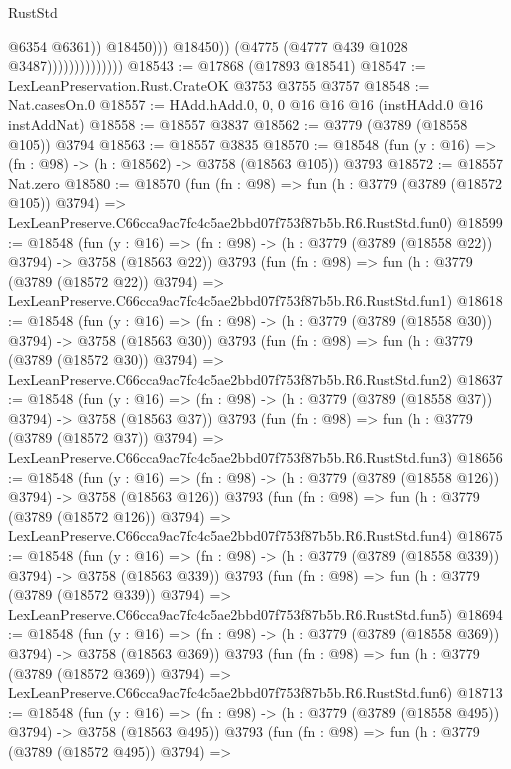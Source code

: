 \begin{lexlean}{RustStd}
\begin{coremodule}
                                          @6354
                                          @6361))
                                      @18450)))
                                @18450))
                            (@4775 (@4777 @439 @1028 @3487))))))))))))))
@18543 := @17868 (@17893 @18541)
@18547 := LexLeanPreservation.Rust.CrateOK @3753 @3755 @3757
@18548 := Nat.casesOn.{0}
@18557 := HAdd.hAdd.{0, 0, 0} @16 @16 @16 (instHAdd.{0} @16 instAddNat)
@18558 := @18557 @3837
@18562 := @3779 (@3789 (@18558 @105)) @3794
@18563 := @18557 @3835
@18570 := @18548 (fun (y : @16) => (fn : @98) -> (h : @18562) -> @3758 (@18563 @105)) @3793
@18572 := @18557 Nat.zero
@18580 := @18570
    (fun (fn : @98) =>
    fun (h : @3779 (@3789 (@18572 @105)) @3794) =>
    LexLeanPreserve.C66cca9ac7fc4c5ae2bbd07f753f87b5b.R6.RustStd.fun0)
@18599 := @18548
    (fun (y : @16) => (fn : @98) -> (h : @3779 (@3789 (@18558 @22)) @3794) -> @3758 (@18563 @22))
    @3793
    (fun (fn : @98) =>
    fun (h : @3779 (@3789 (@18572 @22)) @3794) =>
    LexLeanPreserve.C66cca9ac7fc4c5ae2bbd07f753f87b5b.R6.RustStd.fun1)
@18618 := @18548
    (fun (y : @16) => (fn : @98) -> (h : @3779 (@3789 (@18558 @30)) @3794) -> @3758 (@18563 @30))
    @3793
    (fun (fn : @98) =>
    fun (h : @3779 (@3789 (@18572 @30)) @3794) =>
    LexLeanPreserve.C66cca9ac7fc4c5ae2bbd07f753f87b5b.R6.RustStd.fun2)
@18637 := @18548
    (fun (y : @16) => (fn : @98) -> (h : @3779 (@3789 (@18558 @37)) @3794) -> @3758 (@18563 @37))
    @3793
    (fun (fn : @98) =>
    fun (h : @3779 (@3789 (@18572 @37)) @3794) =>
    LexLeanPreserve.C66cca9ac7fc4c5ae2bbd07f753f87b5b.R6.RustStd.fun3)
@18656 := @18548
    (fun (y : @16) => (fn : @98) -> (h : @3779 (@3789 (@18558 @126)) @3794) -> @3758 (@18563 @126))
    @3793
    (fun (fn : @98) =>
    fun (h : @3779 (@3789 (@18572 @126)) @3794) =>
    LexLeanPreserve.C66cca9ac7fc4c5ae2bbd07f753f87b5b.R6.RustStd.fun4)
@18675 := @18548
    (fun (y : @16) => (fn : @98) -> (h : @3779 (@3789 (@18558 @339)) @3794) -> @3758 (@18563 @339))
    @3793
    (fun (fn : @98) =>
    fun (h : @3779 (@3789 (@18572 @339)) @3794) =>
    LexLeanPreserve.C66cca9ac7fc4c5ae2bbd07f753f87b5b.R6.RustStd.fun5)
@18694 := @18548
    (fun (y : @16) => (fn : @98) -> (h : @3779 (@3789 (@18558 @369)) @3794) -> @3758 (@18563 @369))
    @3793
    (fun (fn : @98) =>
    fun (h : @3779 (@3789 (@18572 @369)) @3794) =>
    LexLeanPreserve.C66cca9ac7fc4c5ae2bbd07f753f87b5b.R6.RustStd.fun6)
@18713 := @18548
    (fun (y : @16) => (fn : @98) -> (h : @3779 (@3789 (@18558 @495)) @3794) -> @3758 (@18563 @495))
    @3793
    (fun (fn : @98) =>
    fun (h : @3779 (@3789 (@18572 @495)) @3794) =>

\end{coremodule}
\end{lexlean}
